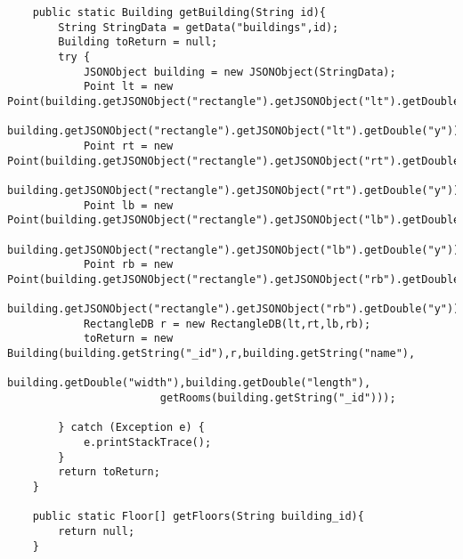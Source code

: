 \begin{lstlisting}
    public static Building getBuilding(String id){
        String StringData = getData("buildings",id);
        Building toReturn = null;
        try {
            JSONObject building = new JSONObject(StringData);
            Point lt = new Point(building.getJSONObject("rectangle").getJSONObject("lt").getDouble("x"),
                                 building.getJSONObject("rectangle").getJSONObject("lt").getDouble("y"));
            Point rt = new Point(building.getJSONObject("rectangle").getJSONObject("rt").getDouble("x"),
                        building.getJSONObject("rectangle").getJSONObject("rt").getDouble("y"));
            Point lb = new Point(building.getJSONObject("rectangle").getJSONObject("lb").getDouble("x"),
                        building.getJSONObject("rectangle").getJSONObject("lb").getDouble("y"));
            Point rb = new Point(building.getJSONObject("rectangle").getJSONObject("rb").getDouble("x"),
                       building.getJSONObject("rectangle").getJSONObject("rb").getDouble("y"));
            RectangleDB r = new RectangleDB(lt,rt,lb,rb);
            toReturn = new Building(building.getString("_id"),r,building.getString("name"),
                        building.getDouble("width"),building.getDouble("length"),
                        getRooms(building.getString("_id")));

        } catch (Exception e) {
            e.printStackTrace();
        }
        return toReturn;
    }

    public static Floor[] getFloors(String building_id){
        return null;
    }


\end{lstlisting}
